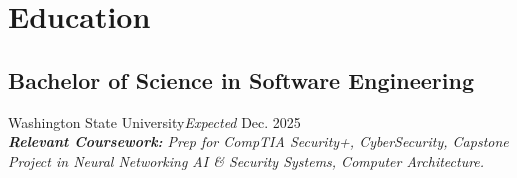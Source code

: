 \section{Education}
\subsection{Bachelor of Science in Software Engineering}{Washington State University}{\textit{Expected} Dec. 2025}
\\ \textit{\textbf{Relevant Coursework:} Prep for CompTIA Security+, CyberSecurity, Capstone Project in Neural Networking AI & Security Systems, Computer Architecture.} 
\vspace{0.2em}
